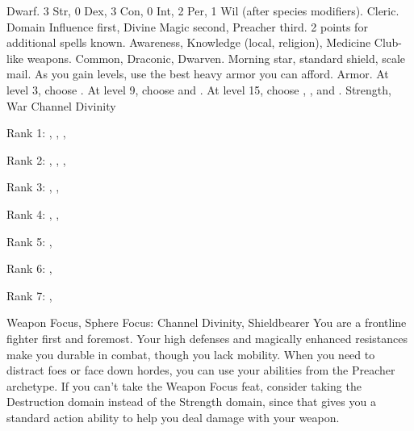              Dwarf.
             3 Str, 0 Dex, 3 Con, 0 Int, 2 Per, 1 Wil (after species modifiers).
             Cleric.
             Domain Influence first, Divine Magic second, Preacher third.
             2 points for additional spells known.
             Awareness, Knowledge (local, religion), Medicine
             Club-like weapons.
             Common, Draconic, Dwarven.
             Morning star, standard shield, scale mail. As you gain levels, use the best heavy armor you can afford.
             Armor.
                At level 3, choose .
                At level 9, choose  and .
                At level 15, choose , , and .
             Strength, War
             Channel Divinity
            \begin{raggeditemize}
                \item Rank 1: , , , 
                \item Rank 2: , , , 
                \item Rank 3: , , 
                \item Rank 4: , , 
                \item Rank 5: , 
                \item Rank 6: , 
                \item Rank 7: , 
            \end{raggeditemize}
             Weapon Focus, Sphere Focus: Channel Divinity, Shieldbearer
             You are a frontline fighter first and foremost.
            Your high defenses and magically enhanced resistances make you durable in combat, though you lack mobility. 
            When you need to distract foes or face down hordes, you can use your abilities from the Preacher archetype.
            If you can't take the Weapon Focus feat, consider taking the Destruction domain instead of the Strength domain, since that gives you a standard action ability to help you deal damage with your weapon.

